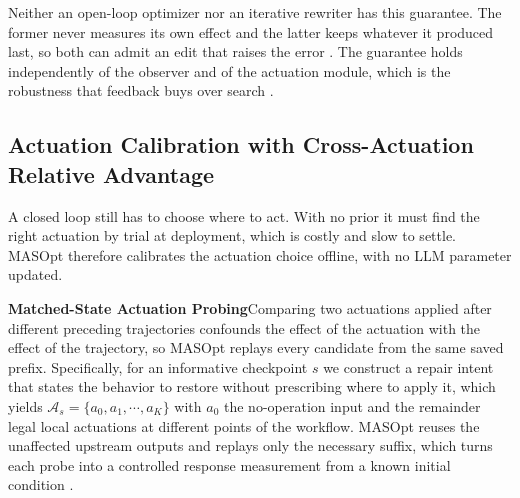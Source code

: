 \documentclass{article}
\theoremstyle{definition}
\begin{document}
Neither an open-loop optimizer nor an iterative rewriter has this guarantee. The former never measures its own effect and the latter keeps whatever it produced last, so both can admit an edit that raises the error \citep{fernando2024promptbreeder,madaan2023selfrefine}. The guarantee holds independently of the observer and of the actuation module, which is the robustness that feedback buys over search \citep{astrom2008feedback}.

\subsection{Actuation Calibration with Cross-Actuation Relative Advantage}
\label{sec:cara}

A closed loop still has to choose where to act. With no prior it must find the right actuation by trial at deployment, which is costly and slow to settle. MASOpt therefore calibrates the actuation choice offline, with no LLM parameter updated.

\textbf{Matched-State Actuation Probing}\quad Comparing two actuations applied after different preceding trajectories confounds the effect of the actuation with the effect of the trajectory, so MASOpt replays every candidate from the same saved prefix. Specifically, for an informative checkpoint $s$ we construct a repair intent that states the behavior to restore without prescribing where to apply it, which yields $\mathcal{A}_s = \{ a_0, a_1, \cdots, a_K \}$ with $a_0$ the no-operation input and the remainder legal local actuations at different points of the workflow. MASOpt reuses the unaffected upstream outputs and replays only the necessary suffix, which turns each probe into a controlled response measurement from a known initial condition \citep{astrom2008feedback,goodwin2001control}.
\end{document}
